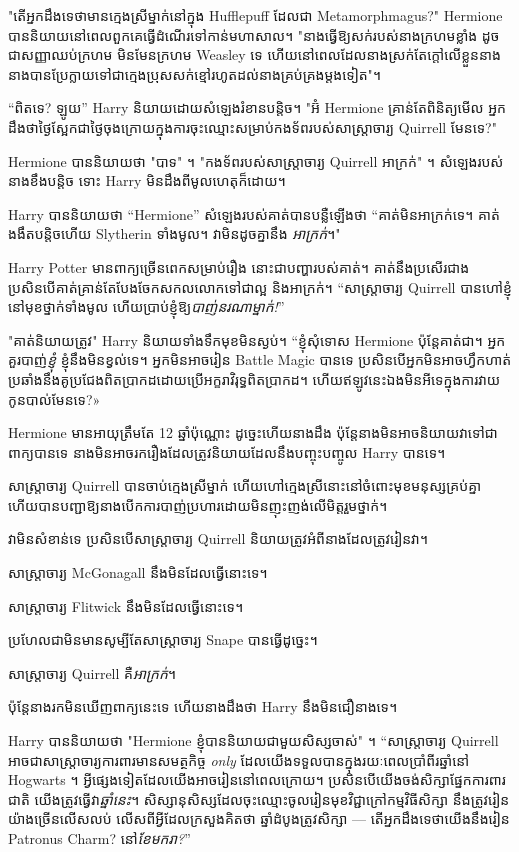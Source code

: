 {"តើអ្នកដឹងទេថាមានក្មេងស្រីម្នាក់នៅក្នុង Hufflepuff ដែលជា Metamorphmagus?" Hermione បាននិយាយនៅពេលពួកគេធ្វើដំណើរទៅកាន់មហាសាល។ "នាងធ្វើឱ្យសក់របស់នាងក្រហមខ្លាំង ដូចជាសញ្ញាឈប់ក្រហម មិនមែនក្រហម Weasley ទេ ហើយនៅពេលដែលនាងស្រក់តែក្តៅលើខ្លួននាង នាងបានប្រែក្លាយទៅជាក្មេងប្រុសសក់ខ្មៅរហូតដល់នាងគ្រប់គ្រងម្តងទៀត"។

“ពិតទេ? ឡូយ” Harry និយាយដោយសំឡេងរំខានបន្តិច។ "អ៊ំ Hermione គ្រាន់តែពិនិត្យមើល អ្នកដឹងថាថ្ងៃស្អែកជាថ្ងៃចុងក្រោយក្នុងការចុះឈ្មោះសម្រាប់កងទ័ពរបស់សាស្រ្តាចារ្យ Quirrell មែនទេ?"

Hermione បាននិយាយថា "បាទ" ។ "កងទ័ពរបស់សាស្រ្តាចារ្យ Quirrell អាក្រក់" ។ សំឡេង​របស់​នាង​ខឹង​បន្តិច ទោះ Harry មិន​ដឹង​ពី​មូលហេតុ​ក៏​ដោយ។

Harry បាននិយាយថា “Hermione” សំឡេងរបស់គាត់បានបន្លឺឡើងថា “គាត់មិនអាក្រក់ទេ។ គាត់ងងឹតបន្តិចហើយ Slytherin ទាំងមូល។ វា​មិន​ដូច​គ្នា​នឹង \emph{អាក្រក់}។"

Harry Potter មានពាក្យច្រើនពេកសម្រាប់រឿង នោះជាបញ្ហារបស់គាត់។ គាត់នឹងប្រសើរជាងប្រសិនបើគាត់គ្រាន់តែបែងចែកសកលលោកទៅជាល្អ និងអាក្រក់។ “សាស្រ្តាចារ្យ Quirrell បានហៅខ្ញុំនៅមុខថ្នាក់ទាំងមូល ហើយប្រាប់ខ្ញុំឱ្យ\emph{បាញ់នរណាម្នាក់!}”

"គាត់និយាយត្រូវ" Harry និយាយទាំងទឹកមុខមិនស្ងប់។ “ខ្ញុំសុំទោស Hermione ប៉ុន្តែគាត់ជា។ អ្នកគួរបាញ់\emph{ខ្ញុំ} ខ្ញុំនឹងមិនខ្វល់ទេ។ អ្នក​មិន​អាច​រៀន Battle Magic បាន​ទេ ប្រសិន​បើ​អ្នក​មិន​អាច​ហ្វឹកហាត់​ប្រឆាំង​នឹង​គូប្រជែង​ពិត​ប្រាកដ​ដោយ​ប្រើ​អក្ខរាវិរុទ្ធ​ពិតប្រាកដ។ ហើយ​ឥឡូវ​នេះ​ឯង​មិន​អី​ទេ​ក្នុង​ការ​វាយ​កូន​បាល់​មែន​ទេ?»

Hermione មានអាយុត្រឹមតែ 12 ឆ្នាំប៉ុណ្ណោះ ដូច្នេះហើយនាងដឹង ប៉ុន្តែនាងមិនអាចនិយាយវាទៅជាពាក្យបានទេ នាងមិនអាចរករឿងដែលត្រូវនិយាយដែលនឹងបញ្ចុះបញ្ចូល Harry បានទេ។

សាស្ត្រាចារ្យ Quirrell បានចាប់ក្មេងស្រីម្នាក់ ហើយហៅក្មេងស្រីនោះនៅចំពោះមុខមនុស្សគ្រប់គ្នា ហើយបានបញ្ជាឱ្យនាងបើកការបាញ់ប្រហារដោយមិនញុះញង់លើមិត្តរួមថ្នាក់។

វាមិនសំខាន់ទេ \emph{{}} ប្រសិនបើសាស្រ្តាចារ្យ Quirrell និយាយត្រូវអំពីនាងដែលត្រូវរៀនវា។

សាស្រ្តាចារ្យ McGonagall នឹងមិនដែលធ្វើនោះទេ។

សាស្រ្តាចារ្យ Flitwick នឹងមិនដែលធ្វើនោះទេ។

ប្រហែលជាមិនមានសូម្បីតែសាស្រ្តាចារ្យ Snape បានធ្វើដូច្នេះ។

សាស្រ្តាចារ្យ Quirrell គឺ\emph{អាក្រក់}។

ប៉ុន្តែនាងរកមិនឃើញពាក្យនេះទេ ហើយនាងដឹងថា Harry នឹងមិនជឿនាងទេ។

Harry បាននិយាយថា "Hermione ខ្ញុំបាននិយាយជាមួយសិស្សចាស់" ។ “សាស្រ្តាចារ្យ Quirrell អាចជាសាស្ត្រាចារ្យការពារមានសមត្ថកិច្ច\emph{ only} ដែលយើងទទួលបានក្នុងរយៈពេលប្រាំពីរឆ្នាំនៅ Hogwarts ។ អ្វីផ្សេងទៀតដែលយើងអាចរៀននៅពេលក្រោយ។ ប្រសិនបើយើងចង់សិក្សាផ្នែកការពារជាតិ យើងត្រូវធ្វើវា\emph{ឆ្នាំនេះ}។ សិស្សានុសិស្សដែលចុះឈ្មោះចូលរៀនមុខវិជ្ជាក្រៅកម្មវិធីសិក្សា នឹងត្រូវរៀនយ៉ាងច្រើនលើសលប់ លើសពីអ្វីដែលក្រសួងគិតថា ឆ្នាំដំបូងត្រូវសិក្សា — តើអ្នកដឹងទេថាយើងនឹងរៀន Patronus Charm? នៅ\emph{ខែមករា?}”

}
